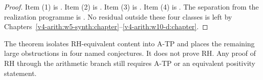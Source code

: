 \begin{proof}
Item (1) is . Item (2) is
. Item (3) is
. Item (4) is
. The separation from
the realization programme is .
No residual outside these four classes is left by
Chapters~\ref{v4-arith:w5-synth:chapter}--\ref{v4-arith:w10-d:chapter}.
\end{proof}

\begin{remark}
\label{v4-arith:w10-final:rem:not-rh}
The theorem isolates RH-equivalent content into A-TP and places the
remaining large obstructions in four named conjectures. It does not
prove RH. Any proof of RH through the arithmetic branch still requires
A-TP or an equivalent positivity statement.
\end{remark}
